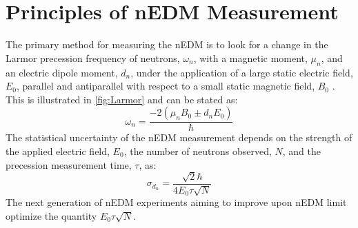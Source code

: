 \section{Principles of nEDM Measurement}

The primary method for measuring the nEDM is to look for a change in the Larmor precession frequency of neutrons, $\omega_n$, with a magnetic moment, $\mu_n$, and an electric dipole moment, $d_n$, under the application of a large static electric field, $E_0$, parallel and antiparallel with respect to a small static magnetic field, $B_0$ \cite{Ahmed2019}. This is illustrated in \cref{fig:Larmor} and can be stated as:
\begin{equation} \label{eq:larmor}
\omega_n=\frac{-2\left(\mu_n B_0\pm d_n E_0\right)}{\hbar}
\end{equation}
The statistical uncertainty of the nEDM measurement depends on the strength of the applied electric field, $E_0$, the number of neutrons observed, $N$, and the precession measurement time, $\tau$, \cite{Ahmed2019} as:
\begin{equation} \label{eq:uncertainty}
\sigma_{d_n}=\frac{\sqrt{2} \hbar}{4 E_0 \tau \sqrt{N}}
\end{equation}
The next generation of nEDM experiments aiming to improve upon nEDM limit optimize the quantity $ E_0 \tau \sqrt{N} $.


